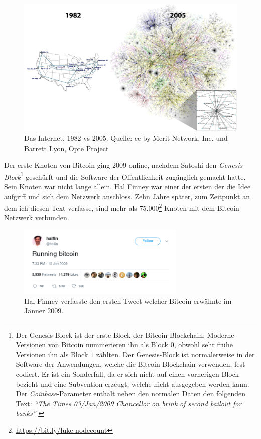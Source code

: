 \begin{figure}
  \includegraphics[width=\textwidth]{assets/images/internet-evolution-white-dates.png}
  \caption{Das Internet, 1982 vs 2005. Quelle: cc-by Merit Network, Inc. und
  Barrett Lyon, Opte Project}
  \label{fig:internet-evolution-white-dates}
\end{figure}

Der erste Knoten von Bitcoin ging 2009 online, nachdem Satoshi den
\textit{Genesis-Block}\footnote{ Der Genesis-Block ist der erste Block der
Bitcoin Blockchain. Moderne Versionen von Bitcoin nummerieren ihn als Block $0$,
obwohl sehr frühe Versionen ihn als Block $1$ zählten. Der Genesis-Block ist
normalerweise in der Software der Anwendungen, welche die Bitcoin Blockchain
verwenden, fest codiert.  Er ist ein Sonderfall, da er sich nicht auf einen
vorherigen Block bezieht und eine Subvention erzeugt, welche nicht ausgegeben
werden kann. Der \textit{Coinbase}-Parameter enthält neben den normalen Daten
den folgenden Text: \textit{\enquote{The Times 03/Jan/2009 Chancellor on brink
of second bailout for banks}} \cite{btcwiki:genesis-block}} geschürft und die
Software der Öffentlichkeit zugänglich gemacht hatte. Sein Knoten war nicht
lange allein. Hal Finney war einer der ersten der die Idee aufgriff und
sich dem Netzwerk anschloss. Zehn Jahre später, zum Zeitpunkt an dem ich diesen
Text verfasse, sind mehr als
$75.000$\footnote{\url{https://bit.ly/luke-nodecount}} Knoten mit dem Bitcoin
Netzwerk verbunden.

\begin{figure}
  \centering
  \includegraphics[width=8cm]{assets/images/running-bitcoin.png}
  \caption{Hal Finney verfasste den ersten Tweet welcher Bitcoin erwähnte im
  Jänner 2009.}
  \label{fig:running-bitcoin}
\end{figure}

